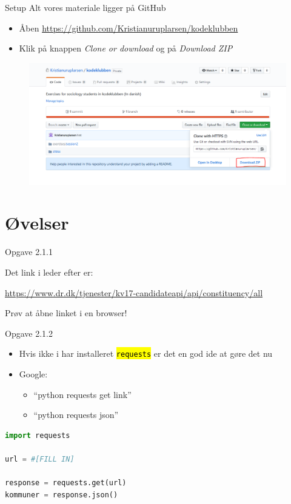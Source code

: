 \documentclass[10pt]{beamer}
\let\OldTexttt\texttt
\renewcommand{\texttt}[1]{\OldTexttt{\hl{#1}}}%
\begin{document}
\begin{frame}[fragile]{Setup}
  Alt vores materiale ligger på GitHub
\begin{itemize}
  \item Åben \href{https://github.com/Kristianuruplarsen/kodeklubben}{https://github.com/Kristianuruplarsen/kodeklubben}
  \item Klik på knappen \textit{Clone or download} og på \textit{Download ZIP}
\end{itemize}

\begin{figure}
  \center
  \includegraphics[width=\textwidth]{figs/setup.PNG}
\end{figure}
\end{frame}



\section{Øvelser}
\begin{frame}[fragile]{Opgave 2.1.1}

\pause
Det link i leder efter er:
\begin{centering}
\href{'https://www.dr.dk/tjenester/kv17-candidateapi/api/constituency/all'}{https://www.dr.dk/tjenester/kv17-candidateapi/api/constituency/all}
\end{centering}
Prøv at åbne linket i en browser!

\end{frame}

\begin{frame}[fragile]{Opgave 2.1.2}

\begin{itemize}
  \item Hvis ikke i har installeret \texttt{requests} er det en god ide at gøre det nu
  \item Google:
  \begin{itemize}
    \item ``python requests get link''
    \item ``python requests json''
  \end{itemize}
\end{itemize}

\pause
\begin{lstlisting}[language=python]
import requests

url = #[FILL IN]

response = requests.get(url)
kommuner = response.json()
\end{lstlisting}
\end{frame}
\end{document}
